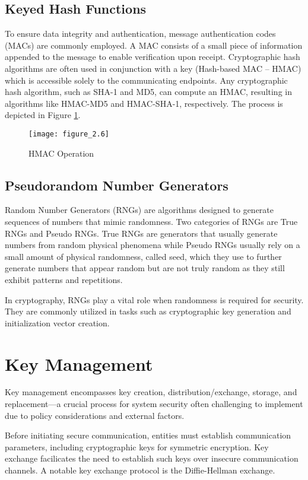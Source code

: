 \subsection{Keyed Hash Functions}
To ensure data integrity and authentication, message authentication codes (MACs) are commonly employed. A MAC consists of a small piece of information appended to the message to enable verification upon receipt. Cryptographic hash algorithms are often used in conjunction with a key (Hash-based MAC – HMAC) which is accessible solely to the communicating endpoints. Any cryptographic hash algorithm, such as SHA-1 and MD5, can compute an HMAC, resulting in algorithms like HMAC-MD5 and HMAC-SHA-1, respectively. The process is depicted in Figure \ref{fig:figure2.6}.

\begin{figure}
\centering
\texttt{[image: figure\_2.6]}\\
\caption{HMAC Operation}
\label{fig:figure2.6}
\end{figure}

\subsection{Pseudorandom Number Generators}
Random Number Generators (RNGs) are algorithms designed to generate sequences of numbers that mimic randomness. Two categories of RNGs are True RNGs and Pseudo RNGs.  True RNGs are generators that usually generate numbers from random physical phenomena while Pseudo RNGs usually rely on a small amount of physical randomness, called seed, which they use to further generate numbers that appear random but are not truly random as they still exhibit patterns and repetitions. 

In cryptography, RNGs play a vital role when randomness is required for security. They are commonly utilized in tasks such as cryptographic key generation and initialization vector creation.

\section{Key Management}
Key management encompasses key creation, distribution/exchange, storage, and replacement—a crucial process for system security often challenging to implement due to policy considerations and external factors.

Before initiating secure communication, entities must establish communication parameters, including cryptographic keys for symmetric encryption. Key exchange facilicates the need to establish such keys over insecure communication channels. A notable key exchange protocol is the Diffie-Hellman exchange.

